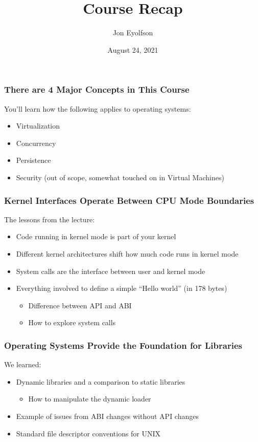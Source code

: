 

\title{Course Recap}
\author{Jon Eyolfson}
\date{August 24, 2021}


  \begin{frame}
    \titlepage
  \end{frame}

  \begin{frame}
    \frametitle{There are 4 Major Concepts in This Course}

    You'll learn how the following applies to operating systems:

    \begin{itemize}
      \item Virtualization
      \item Concurrency
      \item Persistence
      \item Security (out of scope, somewhat touched on in Virtual Machines)
    \end{itemize}
  \end{frame}

  \begin{frame}
    \frametitle{Kernel Interfaces Operate Between CPU Mode Boundaries}

    The lessons from the lecture:
    \begin{itemize}
      \item Code running in kernel mode is part of your kernel
      \item Different kernel architectures shift how much code runs in kernel mode
      \item System calls are the interface between user and kernel mode
      \item Everything involved to define a simple ``Hello world'' (in 178 bytes)
      \begin{itemize}
        \item Difference between API and ABI
        \item How to explore system calls
      \end{itemize}
    \end{itemize}
  \end{frame}

  \begin{frame}
    \frametitle{Operating Systems Provide the Foundation for Libraries}

    We learned:
    \begin{itemize}
      \item Dynamic libraries and a comparison to static libraries
      \begin{itemize}
        \item How to manipulate the dynamic loader
      \end{itemize}
      \item Example of issues from ABI changes without API changes
      \item Standard file descriptor conventions for UNIX
    \end{itemize}
  \end{frame}

